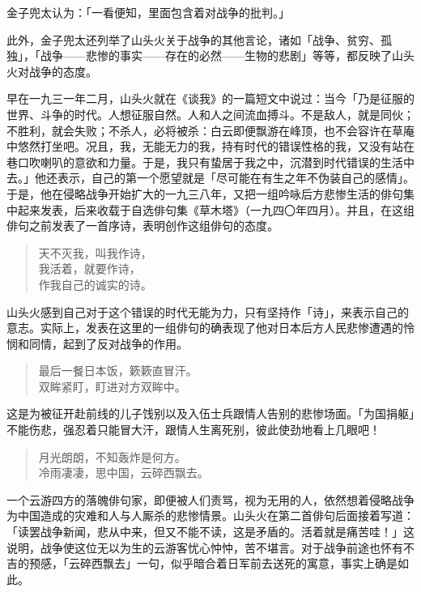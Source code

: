 {    金子兜太认为：「一看便知，里面包含着对战争的批判。」

    此外，金子兜太还列举了山头火关于战争的其他言论，诸如「战争、贫穷、孤独」，「战争——悲惨的事实——存在的必然——生物的悲剧」等等，都反映了山头火对战争的态度。

    早在一九三一年二月，山头火就在《谈我》\footnotemark[12]的一篇短文中说过：当今「乃是征服的世界、斗争的时代。人想征服自然。人和人之间流血搏斗。不是敌人，就是同伙；不胜利，就会失败；不杀人，必将被杀：白云即便飘游在峰顶，也不会容许在草庵中悠然打坐吧。况且，我，无能无力的我，持有时代的错误性格的我，又没有站在巷口吹喇叭的意欲和力量。于是，我只有蛰居于我之中，沉潜到时代错误的生活中去。」他还表示，自己的第一个愿望就是「尽可能在有生之年不伪装自己的感情」。于是，他在侵略战争开始扩大的一九三八年，又把一组吟咏后方悲惨生活的俳句集中起来发表，后来收载于自选俳句集《草木塔》（一九四〇年四月）。并且，在这组俳句之前发表了一首序诗，表明创作这组俳句的态度。


    \begin{quote}
        天不灭我，叫我作诗，\\
        我活着，就要作诗，\\
        作我自己的诚实的诗。
    \end{quote}

    山头火感到自己对于这个错误的时代无能为力，只有坚持作「诗」，来表示自己的意志。实际上，发表在这里的一组俳句的确表现了他对日本后方人民悲惨遭遇的怜悯和同情，起到了反对战争的作用。
    \begin{quote}
        最后一餐日本饭，簌簌直冒汗。\\
        双眸紧盯，盯进对方双眸中。
    \end{quote}

    这是为被征开赴前线的儿子饯别以及入伍士兵跟情人告别的悲惨场面。「为国捐躯」不能伤悲，强忍着只能冒大汗，跟情人生离死别，彼此使劲地看上几眼吧！

    \begin{quote}
        月光朗朗，不知轰炸是何方。\\
        冷雨凄凄，思中国，云碎西飘去。
    \end{quote}

    一个云游四方的落魄俳句家，即便被人们责骂，视为无用的人，依然想着侵略战争为中国造成的灾难和人与人厮杀的悲惨情景。山头火在第二首俳句后面接着写道：「读罢战争新闻，悲从中来，但又不能不读，这是矛盾的。活着就是痛苦哇！」这说明，战争使这位无以为生的云游客忧心忡忡，苦不堪言。对于战争前途也怀有不吉的预感，「云碎西飘去」一句，似乎暗合着日军前去送死的寓意，事实上确是如此。

}
